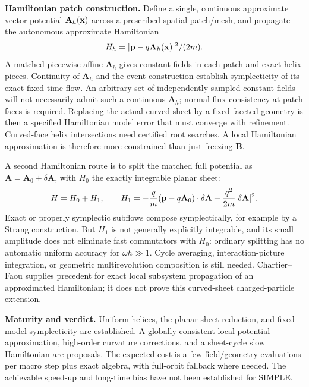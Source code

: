 \documentclass[10pt,a4paper]{article}
\newcommand{\B}{\mathbf B}\newcommand{\bunit}{\mathbf b}
\newcommand{\A}{\mathbf A}\newcommand{\dd}{\mathrm d}
\begin{document}
\textbf{Hamiltonian patch construction.} Define a single, continuous approximate vector potential $\A_h(\x)$ across a prescribed spatial patch/mesh, and propagate the autonomous approximate Hamiltonian
\begin{equation}
 H_h=|\p-q\A_h(\x)|^2/(2m).
\end{equation}
A matched piecewise affine $\A_h$ gives constant fields in each patch and exact helix pieces. Continuity of $\A_h$ and the event construction establish symplecticity of its exact fixed-time flow. An arbitrary set of independently sampled constant fields will not necessarily admit such a continuous $\A_h$; normal flux consistency at patch faces is required. Replacing the actual curved sheet by a fixed faceted geometry is then a specified Hamiltonian model error that must converge with refinement. Curved-face helix intersections need certified root searches. A local Hamiltonian approximation is therefore more constrained than just freezing $\B$.

A second Hamiltonian route is to split the matched full potential as $\A=\A_0+\delta\A$, with $H_0$ the exactly integrable planar sheet:
\begin{equation}\label{eq:Hsplit}
 H=H_0+H_1,\qquad
 H_1=-\frac q m(\p-q\A_0)\cdot\delta\A
                     +\frac{q^2}{2m}|\delta\A|^2.
\end{equation}
Exact or properly symplectic subflows compose symplectically, for example by a Strang construction. But $H_1$ is not generally explicitly integrable, and its small amplitude does not eliminate fast commutators with $H_0$: ordinary splitting has no automatic uniform accuracy for $\omega h\gg1$. Cycle averaging, interaction-picture integration, or geometric multirevolution composition is still needed. Chartier--Faou \cite{piecewise} supplies precedent for exact local subsystem propagation of an approximated Hamiltonian; it does not prove this curved-sheet charged-particle extension.

\textbf{Maturity and verdict.} Uniform helices, the planar sheet reduction, and fixed-model symplecticity are established. A globally consistent local-potential approximation, high-order curvature corrections, and a sheet-cycle slow Hamiltonian are proposals. The expected cost is a few field/geometry evaluations per macro step plus exact algebra, with full-orbit fallback where needed. The achievable speed-up and long-time bias have not been established for SIMPLE.
\end{document}
